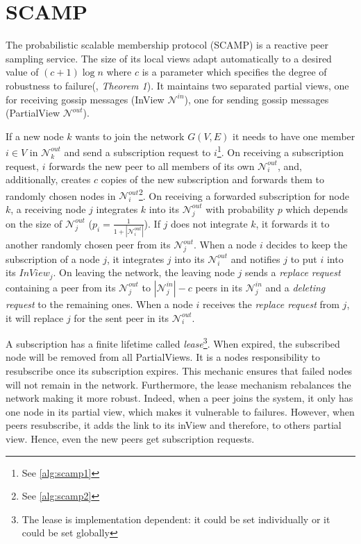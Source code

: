 \documentclass[11pt, english, screen]{report-rd-info}
\begin{document}
\section{SCAMP}

The probabilistic scalable membership protocol (SCAMP)\cite{Ganesh:2001:SPL:648089.747488} is a reactive peer sampling service.
The size of its local views adapt automatically to a desired value of $(c+1)\log{n}$ where $c$ is a  parameter which specifies the degree of robustness to failure(\cite{Kermarrec:2003:PRD:766617.766623}, \emph{Theorem 1}).
It maintains two separated partial views\cite{Ganesh:2003:PMM:642778.642782}, one for receiving gossip messages (InView $\mathcal{N}^{in}$), one for sending gossip messages (PartialView $\mathcal{N}^{out}$).

If a new node $k$ wants to join the network $G(V,E)$ it needs to have one member $i \in V$ in $\mathcal{N}_k^{out}$ and send a subscription request to $i$\footnote{See \ref{alg:scamp1}}.
On receiving a subscription request, $i$ forwards the new peer to all members of its own $\mathcal{N}_i^{out}$, and, additionally, creates $c$ copies of the new subscription and forwards them to randomly chosen nodes in $\mathcal{N}_i^{out}$\footnote{See \ref{alg:scamp2}}.
On receiving a forwarded subscription for node $k$, a receiving node $j$ integrates $k$ into its $\mathcal{N}_j^{out}$ with probability $p$ which depends on the size of $\mathcal{N}_j^{out}$ ($p_i=\frac{1}{1+|\mathcal{N}_i^{out}|}$). 
If $j$ does not integrate $k$, it forwards it to another randomly chosen peer from its $\mathcal{N}_j^{out}$.
When a node $i$ decides to keep the subscription of a node $j$, it integrates $j$ into its $\mathcal{N}_i^{out}$ and notifies $j$ to put $i$ into its $InView_j$.
On leaving the network, the leaving node $j$ sends a \emph{replace request} containing a peer from its $\mathcal{N}_j^{out}$ to $|\mathcal{N}_j^{in}|-c$ peers in its $\mathcal{N}_j^{in}$ and a \emph{deleting request} to the remaining ones.
When a node $i$ receives the \emph{replace request} from $j$, it will replace $j$ for the sent peer in its $\mathcal{N}_i^{out}$.

A subscription has a finite lifetime called \emph{lease}\footnote{The lease is implementation dependent: it could be set individually or it could be set globally}.
When expired, the subscribed node will be removed from all PartialViews.
It is a nodes responsibility to resubscribe once its subscription expires.
This mechanic ensures that failed nodes will not remain in the network.
Furthermore, the lease mechanism rebalances the network making it more robust.
Indeed, when a peer joins the system, it only has one node in its partial view, which makes it vulnerable to failures.
However, when peers resubscribe, it adds the link to its inView and therefore, to others partial view.
Hence, even the new peers get subscription requests.
\end{document}
